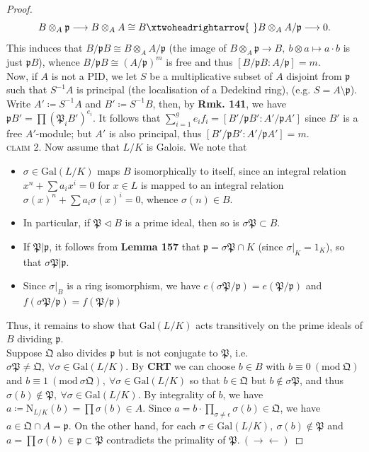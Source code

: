 \documentclass[12pt,a4paper,footinclude=true,headinclude=true]{scrbook} %
\begin{document}
\begin{proof}
    \begin{equation*}
        B\otimes_A\mathfrak{p}\longrightarrow B\otimes_AA\cong B\xtwoheadrightarrow{~} B\otimes_AA/\mathfrak{p}\longrightarrow0.
    \end{equation*}
    This induces that $B/\mathfrak{p}B\cong B\otimes_AA/\mathfrak{p}$ (the image of $B\otimes_A\mathfrak{p}\to B,\ b\otimes a\mapsto a\cdot b$ is just $\mathfrak{p}B$), whence $B/\mathfrak{p}B\cong(A/\mathfrak{p})^m$ is free and thus $[B/\mathfrak{p}B:A/\mathfrak{p}]=m$.\\
    Now, if $A$ is not a PID, we let $S$ be a multiplicative subset of $A$ disjoint from $\mathfrak{p}$ such that $S^{-1}A$ is principal (the localisation of a Dedekind ring), (e.g. $S=A\setminus\mathfrak{p}$). Write $A'\coloneqq S^{-1}A$ and $B'\coloneqq S^{-1}B$, then, by \textbf{Rmk. 141}, we have $\mathfrak{p}B'=\prod(\mathfrak{P}_iB')^{e_i}$. It follows that $\sum_{i=1}^ge_if_i=[B'/\mathfrak{p}B':A'/\mathfrak{p}A']$ since $B'$ is a free $A'$-module; but $A'$ is also principal, thus $[B'/\mathfrak{p}B':A'/\mathfrak{p}A']=m$.\\
    \textsc{claim 2.} Now assume that $L/K$ is Galois. We note that
    \begin{itemize}
        \item $\sigma\in\mathrm{Gal}(L/K)$ maps $B$ isomorphically to itself, since an integral relation $x^n+\sum a_ix^i=0$ for $x\in L$ is mapped to an integral relation $\sigma(x)^n+\sum a_i\sigma(x)^i=0$, whence $\sigma(n)\in B$. 
        \item In particular, if $\mathfrak{P}\triangleleft B$ is a prime ideal, then so is $\sigma\mathfrak{P}\subset B$.
        \item If $\mathfrak{P}|\mathfrak{p}$, it follows from \textbf{Lemma 157} that $\mathfrak{p}=\sigma\mathfrak{P}\cap K$ (since $\sigma|_K=1_K$), so that $\sigma\mathfrak{P}|\mathfrak{p}$.
        \item Since $\sigma|_B$ is a ring isomorphism, we have $e(\sigma \mathfrak{P}/\mathfrak{p})=e(\mathfrak{P}/\mathfrak{p})$ and $f(\sigma\mathfrak{P}/\mathfrak{p})=f(\mathfrak{P}/\mathfrak{p})$
    \end{itemize}
    Thus, it remains to show that $\mathrm{Gal}(L/K)$ acts transitively on the prime ideals of $B$ dividing $\mathfrak{p}$.\\
    Suppose $\mathfrak{Q}$ also divides $\mathfrak{p}$ but is not conjugate to $\mathfrak{P}$, i.e. $\sigma\mathfrak{P}\neq\mathfrak{Q},\ \forall\sigma\in\mathrm{Gal}(L/K)$. By \textbf{CRT} we can choose $b\in B$ with $b\equiv0\ (\mathrm{mod}\ \mathfrak{Q})$ and $b\equiv1\ (\mathrm{mod}\ \sigma\mathfrak{Q}),\ \forall\sigma\in\mathrm{Gal}(L/K)$ so that $b\in\mathfrak{Q}$ but $b\notin\sigma\mathfrak{P}$, and thus $\sigma(b)\notin\mathfrak{P},\ \forall\sigma\in\mathrm{Gal}(L/K)$. By integrality of $b$, we have $a\coloneqq\mathrm{N}_{L/K}(b)=\prod\sigma (b)\in A$. Since $a=b\cdot\prod_{\sigma\neq\epsilon}\sigma(b)\in \mathfrak{Q}$, we have $a\in\mathfrak{Q}\cap A=\mathfrak{p}$. On the other hand, for each $\sigma\in\mathrm{Gal}(L/K),\ \sigma(b)\notin \mathfrak{P}$ and $a=\prod\sigma(b)\in\mathfrak{p}\subset\mathfrak{P}$ contradicts the primality of $\mathfrak{P}.\ (\to\gets)$ 
\end{proof}
\end{document}
